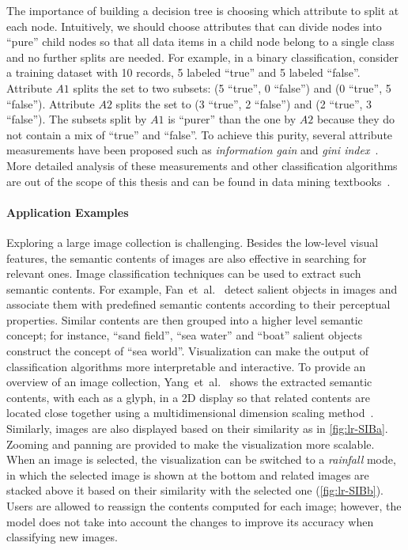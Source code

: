 The importance of building a decision tree is choosing which attribute to split at each node. Intuitively, we should choose attributes that can divide nodes into ``pure'' child nodes so that all data items in a child node belong to a single class and no further splits are needed. For example, in a binary classification, consider a training dataset with 10 records, 5 labeled ``true'' and 5 labeled ``false''. Attribute $A1$ splits the set to two subsets: (5 ``true'', 0 ``false'') and (0 ``true'', 5 ``false''). Attribute $A2$ splits the set to (3 ``true'', 2 ``false'') and (2 ``true'', 3 ``false''). The subsets split by $A1$ is ``purer'' than the one by $A2$ because they do not contain a mix of ``true'' and ``false''. To achieve this purity, several attribute measurements have been proposed such as \emph{information gain} and \emph{gini index}~\cite{Tan2006}. More detailed analysis of these measurements and other classification algorithms are out of the scope of this thesis and can be found in data mining textbooks~\cite{Tan2006,Han2011}.

\paragraph{Application Examples}
Exploring a large image collection is challenging. Besides the low-level visual features, the semantic contents of images are also effective in searching for relevant ones. Image classification techniques can be used to extract such semantic contents. For example, Fan~et~al.~\cite{Fan2004} detect salient objects in images and associate them with predefined semantic contents according to their perceptual properties. Similar contents are then grouped into a higher level semantic concept; for instance, ``sand field'', ``sea water'' and ``boat'' salient objects construct the concept of ``sea world''. Visualization can make the output of classification algorithms more interpretable and interactive. To provide an overview of an image collection, Yang~et~al.~\cite{Yang2006} shows the extracted semantic contents, with each as a glyph, in a 2D display so that related contents are located close together using a multidimensional dimension scaling method~\cite{Borg2005}. Similarly, images are also displayed based on their similarity as in \autoref{fig:lr-SIBa}. Zooming and panning are provided to make the visualization more scalable. When an image is selected, the visualization can be switched to a \emph{rainfall} mode, in which the selected image is shown at the bottom and related images are stacked above it based on their similarity with the selected one (\autoref{fig:lr-SIBb}). Users are allowed to reassign the contents computed for each image; however, the model does not take into account the changes to improve its accuracy when classifying new images.

